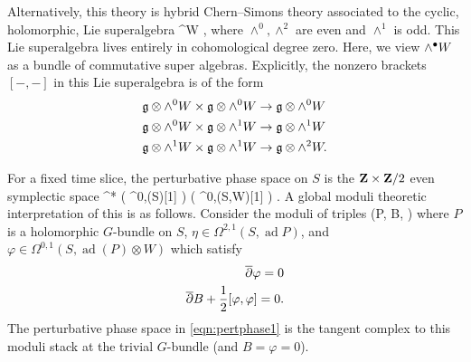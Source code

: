 \documentclass[11pt]{amsart}
\renewcommand{\op}{\operatorname}
\begin{document}
Alternatively, this theory is hybrid Chern--Simons theory associated to the cyclic, holomorphic, Lie superalgebra
\beqn
{} \otimes \wedge^\bu W ,
\eeqn
where $\wedge^0, \wedge^2$ are even and $\wedge^1$ is odd.
This Lie superalgebra lives entirely in cohomological degree zero.
Here, we view $\wedge^\bullet W$ as a bundle of commutative super algebras.
Explicitly, the nonzero brackets $[-,-]$ in this Lie superalgebra is of the form
\begin{align*}
\mathfrak{g} \otimes \wedge^0 W \times \mathfrak{g} \otimes \wedge^0 W & \to \mathfrak{g} \otimes \wedge^0 W  \\
\mathfrak{g} \otimes \wedge^0 W \times \mathfrak{g} \otimes \wedge^1 W & \to \mathfrak{g} \otimes \wedge^1 W \\
\mathfrak{g} \otimes \wedge^1 W \times \mathfrak{g} \otimes \wedge^1 W & \to \mathfrak{g} \otimes \wedge^2 W .
\end{align*}

For a fixed time slice, the perturbative phase space on $S$ is the $\mathbf{Z} \times \mathbf{Z}/2$ even symplectic space
\beqn
\T^* \left(  \otimes \Omega^{0,\bu}(S)[1] \right) \oplus \Pi \left( \otimes \Omega^{0,\bu}(S,W)[1] \right) .
\eeqn
A global moduli theoretic interpretation of this is as follows.
Consider the moduli of triples
\beqn\label{eqn:pertphase1}
(P, B, \varphi)
\eeqn
where $P$ is a holomorphic $G$-bundle on $S$, $\eta \in \Omega^{2,1}(S, \op{ad} P)$, and $\varphi \in \Omega^{0,1}(S,\op{ad}(P) \otimes W)$ which satisfy 
\begin{align*}
\overline{\partial} \varphi = 0 \\
\overline{\partial} B + \frac12 [\varphi,\varphi] = 0 .
\end{align*}
The perturbative phase space in \eqref{eqn:pertphase1} is the tangent complex to this moduli stack at the trivial $G$-bundle (and $B = \varphi = 0$).
\end{document}
